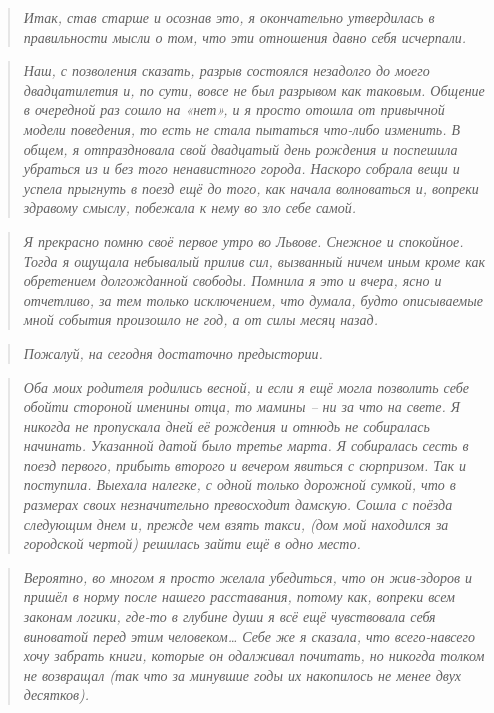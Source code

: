 \documentclass[
  a5paperpaper,
  DIV=11,
  numbers=noendperiod]{scrreprt}
\begin{document}
\begin{quote}
\emph{Итак, став старше и осознав это, я окончательно утвердилась в
правильности мысли о том, что эти отношения давно себя исчерпали.}
\end{quote}

\begin{quote}
\emph{Наш, с позволения сказать, разрыв состоялся незадолго до моего
двадцатилетия и, по сути, вовсе не был разрывом как таковым. Общение в
очередной раз сошло на «нет», и я просто отошла от привычной модели
поведения, то есть не стала пытаться что-либо изменить. В общем, я
отпраздновала свой двадцатый день рождения и поспешила убраться из и без
того ненавистного города. Наскоро собрала вещи и успела прыгнуть в поезд
ещё до того, как начала волноваться и, вопреки здравому смыслу, побежала
к нему во зло себе самой.}
\end{quote}

\begin{quote}
\emph{Я прекрасно помню своё первое утро во Львове. Снежное и спокойное.
Тогда я ощущала небывалый прилив сил, вызванный ничем иным кроме как
обретением долгожданной свободы. Помнила я это и вчера, ясно и
отчетливо, за тем только исключением, что думала, будто описываемые мной
события произошло не год, а от силы месяц назад. }
\end{quote}

\begin{quote}
\emph{Пожалуй, на сегодня достаточно предыстории.}
\end{quote}

\begin{quote}
\emph{Оба моих родителя родились весной, и если я ещё могла позволить
себе обойти стороной именины отца, то мамины -- ни за что на свете. Я
никогда не пропускала дней её рождения и отнюдь не собиралась начинать.
Указанной датой было третье марта. Я собиралась сесть в поезд первого,
прибыть второго и вечером явиться с сюрпризом. Так и поступила. Выехала
налегке, с одной только дорожной сумкой, что в размерах своих
незначительно превосходит дамскую. Сошла с поёзда следующим днем и,
прежде чем взять такси, (дом мой находился за городской чертой) решилась
зайти ещё в одно место.}
\end{quote}

\begin{quote}
\emph{Вероятно, во многом я просто желала убедиться, что он жив-здоров и
пришёл в норму после нашего расставания, потому как, вопреки всем
законам логики, где-то в глубине души я всё ещё чувствовала себя
виноватой перед этим человеком\ldots{} Себе же я сказала, что
всего-навсего хочу забрать книги, которые он одалживал почитать, но
никогда толком не возвращал (так что за минувшие годы их накопилось не
менее двух десятков).}
\end{quote}
\end{document}
